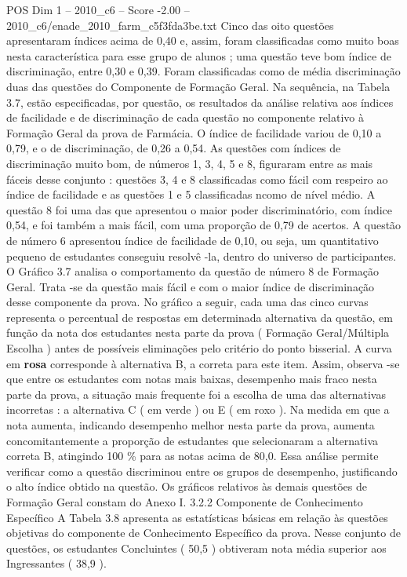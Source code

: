 \begin{textsample}{POS Dim 1 – 2010\_c6 – Score -2.00 – 2010\_c6/enade\_2010\_farm\_c5f3fda3be.txt}
Cinco das oito questões apresentaram índices acima de 0,40 e, assim, foram classificadas como muito boas nesta característica para esse grupo de alunos ; uma questão teve bom índice de discriminação, entre 0,30 e 0,39.
Foram classificadas como de média discriminação duas das questões do Componente de Formação Geral.
Na sequência, na Tabela 3.7, estão especificadas, por questão, os resultados da análise relativa aos índices de facilidade e de discriminação de cada questão no componente relativo à Formação Geral da prova de Farmácia.
O índice de facilidade variou de 0,10 a 0,79, e o de discriminação, de 0,26 a 0,54.
As questões com índices de discriminação muito bom, de números 1, 3, 4, 5 e 8, figuraram entre as mais fáceis desse conjunto : questões 3, 4 e 8 classificadas como fácil com respeiro ao índice de facilidade e as questões 1 e 5 classificadas ncomo de nível médio.
A questão 8 foi uma das que apresentou o maior poder discriminatório, com índice 0,54, e foi também a mais fácil, com uma proporção de 0,79 de acertos.
A questão de número 6 apresentou índice de facilidade de 0,10, ou seja, um quantitativo pequeno de estudantes conseguiu resolvê -la, dentro do universo de participantes.
O Gráfico 3.7 analisa o comportamento da questão de número 8 de Formação Geral.
Trata -se da questão mais fácil e com o maior índice de discriminação desse componente da prova.
No gráfico a seguir, cada uma das cinco curvas representa o percentual de respostas em determinada alternativa da questão, em função da nota dos estudantes nesta parte da prova ( Formação Geral/Múltipla Escolha ) antes de possíveis eliminações pelo critério do ponto bisserial.
A curva em \textbf{rosa} corresponde à alternativa B, a correta para este item.
Assim, observa -se que entre os estudantes com notas mais baixas, desempenho mais fraco nesta parte da prova, a situação mais frequente foi a escolha de uma das alternativas incorretas : a alternativa C ( em verde ) ou E ( em roxo ).
Na medida em que a nota aumenta, indicando desempenho melhor nesta parte da prova, aumenta concomitantemente a proporção de estudantes que selecionaram a alternativa correta B, atingindo 100 \% para as notas acima de 80,0.
Essa análise permite verificar como a questão discriminou entre os grupos de desempenho, justificando o alto índice obtido na questão.
Os gráficos relativos às demais questões de Formação Geral constam do Anexo I. 3.2.2 Componente de Conhecimento Específico A Tabela 3.8 apresenta as estatísticas básicas em relação às questões objetivas do componente de Conhecimento Específico da prova.
Nesse conjunto de questões, os estudantes Concluintes ( 50,5 ) obtiveram nota média superior aos Ingressantes ( 38,9 ).

\end{textsample}
